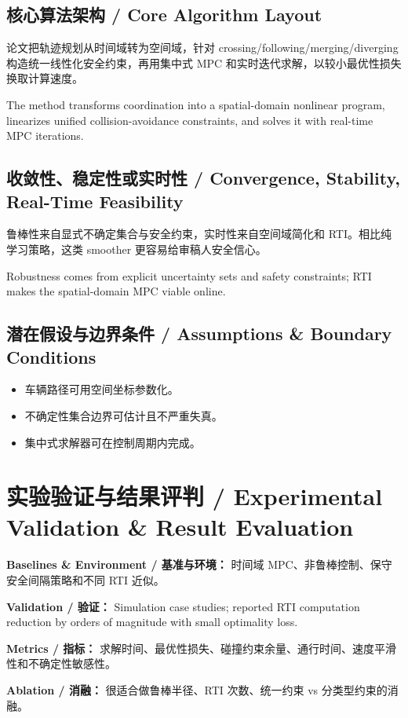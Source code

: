 \documentclass[UTF8,a4paper,11pt,fontset=fandol]{ctexart}
\begin{document}
\subsection{核心算法架构 / Core Algorithm Layout}
论文把轨迹规划从时间域转为空间域，针对 crossing/following/merging/diverging 构造统一线性化安全约束，再用集中式 MPC 和实时迭代求解，以较小最优性损失换取计算速度。

The method transforms coordination into a spatial-domain nonlinear program, linearizes unified collision-avoidance constraints, and solves it with real-time MPC iterations.

\subsection{收敛性、稳定性或实时性 / Convergence, Stability, Real-Time Feasibility}
鲁棒性来自显式不确定集合与安全约束，实时性来自空间域简化和 RTI。相比纯学习策略，这类 smoother 更容易给审稿人安全信心。

Robustness comes from explicit uncertainty sets and safety constraints; RTI makes the spatial-domain MPC viable online.

\subsection{潜在假设与边界条件 / Assumptions \& Boundary Conditions}
\begin{itemize}
\item 车辆路径可用空间坐标参数化。
\item 不确定性集合边界可估计且不严重失真。
\item 集中式求解器可在控制周期内完成。
\end{itemize}


\section{实验验证与结果评判 / Experimental Validation \& Result Evaluation}
\textbf{Baselines \& Environment / 基准与环境：} 时间域 MPC、非鲁棒控制、保守安全间隔策略和不同 RTI 近似。

\textbf{Validation / 验证：} Simulation case studies; reported RTI computation reduction by orders of magnitude with small optimality loss.

\textbf{Metrics / 指标：} 求解时间、最优性损失、碰撞约束余量、通行时间、速度平滑性和不确定性敏感性。

\textbf{Ablation / 消融：} 很适合做鲁棒半径、RTI 次数、统一约束 vs 分类型约束的消融。
\end{document}
